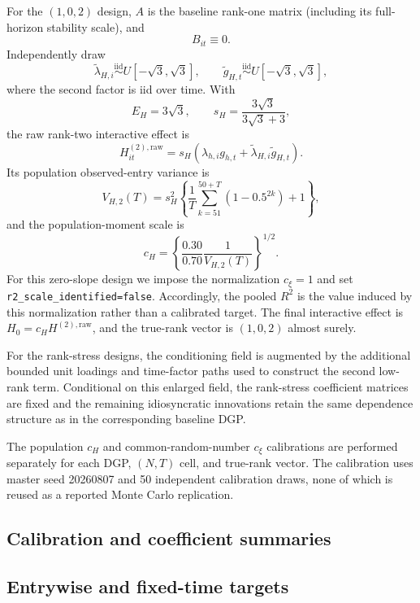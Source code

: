 \documentclass[11pt]{article}
\numberwithin{equation}{section}
\theoremstyle{remark}
\begin{document}
For the $(1,0,2)$ design, $A$ is the baseline rank-one matrix (including
its full-horizon stability scale), and
\[
 B_{it}\equiv0.
\]
Independently draw
\[
 \widetilde\lambda_{H,i}\stackrel{\mathrm{iid}}{\sim}
 U[-\sqrt{3},\sqrt{3}],\qquad
 \widetilde g_{H,t}\stackrel{\mathrm{iid}}{\sim}
 U[-\sqrt{3},\sqrt{3}],
\]
where the second factor is iid over time.  With
\[
 E_H=3\sqrt{3},\qquad s_H=\frac{3\sqrt{3}}{3\sqrt{3}+3},
\]
the raw rank-two interactive effect is
\[
 H_{it}^{(2),\mathrm{raw}}
 =s_H\left(\lambda_{h,i}g_{h,t}
 +\widetilde\lambda_{H,i}\widetilde g_{H,t}\right).
\]
Its population observed-entry variance is
\[
 V_{H,2}(T)=s_H^2\left\{
 \frac1T\sum_{k=51}^{50+T}(1-0.5^{2k})+1\right\},
\]
and the population-moment scale is
\[
 c_H=\left\{\frac{0.30}{0.70}\frac{1}{V_{H,2}(T)}\right\}^{1/2}.
\]
For this zero-slope design we impose the normalization $c_\xi=1$ and set
\texttt{r2\_scale\_identified=false}.  Accordingly, the pooled
$R^2$ is the value induced by this normalization rather than a calibrated
target.  The final interactive effect is
$H_0=c_HH^{(2),\mathrm{raw}}$, and the true-rank vector is $(1,0,2)$
almost surely.

For the rank-stress designs, the conditioning field is augmented by the additional bounded unit loadings and time-factor paths used to construct the second low-rank term. Conditional on this enlarged field, the rank-stress coefficient matrices are fixed and the remaining idiosyncratic innovations retain the same dependence structure as in the corresponding baseline DGP.

The population $c_H$ and common-random-number $c_\xi$ calibrations are
performed separately for each DGP, $(N,T)$ cell, and true-rank vector.
The calibration uses master seed 20260807 and 50 independent calibration
draws, none of which is reused as a reported Monte Carlo replication.

\subsection{Calibration and coefficient summaries}



\subsection{Entrywise and fixed-time targets}




\end{document}
